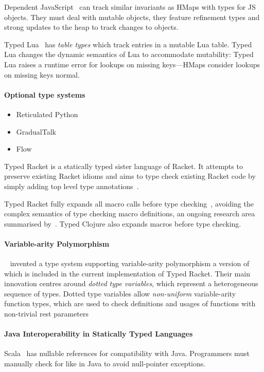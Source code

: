 Dependent JavaScript~\cite{Chugh:2012:DTJ} can track similar invariants as HMaps with types
for JS objects. They must deal with mutable objects, they feature refinement types and strong updates to the heap
to track changes to objects.

Typed Lua~\cite{Maidl:2014:TLO} has \emph{table types} which track entries in a mutable Lua table.
Typed Lua changes the dynamic semantics of Lua to accommodate mutability: Typed Lua raises a runtime error
for lookups on missing keys---HMaps consider lookups on missing keys normal.


\paragraph{Optional type systems}
\begin{itemize}
  \item Reticulated Python~\cite{Vitousek14}
  \item GradualTalk
  \item Flow
\end{itemize}

Typed Racket is a statically typed sister language of Racket. It
attempts to preserve existing Racket idioms and aims to type check
existing Racket code by simply adding top level type annotations~\cite{Tob10}.

Typed Racket fully expands all macro calls before type checking~\cite{Tob10},
avoiding the complex semantics of type checking macro definitions, an ongoing research area summarised
by~\citet{Her10}. Typed Clojure also expands macros before type checking.

\paragraph{Variable-arity Polymorphism}

~\citet{STF09} invented a type system supporting variable-arity polymorphism  %
a version of which is included in the current implementation of Typed Racket.
Their main innovation centres around \emph{dotted type variables}, which represent a heterogeneous sequence
of types. Dotted type variables allow \emph{non-uniform} variable-arity function types,
which are used to check definitions and usages of functions with non-trivial rest parameters

\paragraph{Java Interoperability in Statically Typed Languages}

Scala~\cite{OCD+} has nullable references for compatibility with Java.
Programmers must manually check for
 like in Java to avoid null-pointer exceptions. 

% 
%
